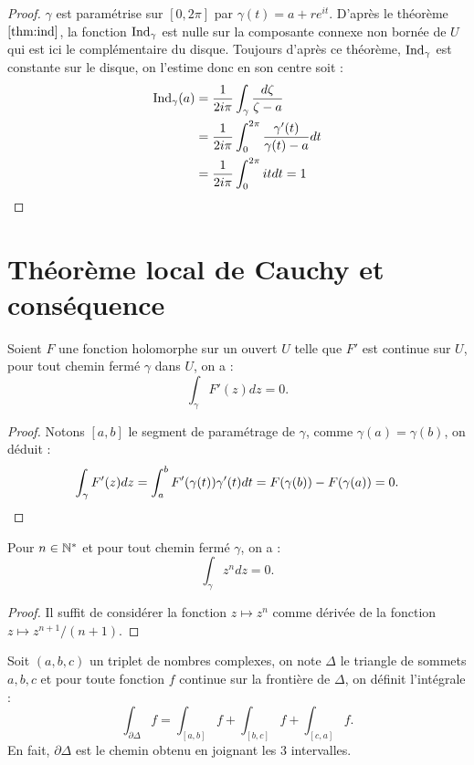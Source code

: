 \begin{proof}
$\gamma$ est paramétrise sur $[0, 2\pi]$ par $\gamma(t) = a + re^{it}$. 
D'après le théorème $\ref{thm:ind}$, la fonction $\operatorname{Ind}_{\gamma}$ est nulle sur la composante connexe non bornée de $U$
qui est ici le complémentaire du disque. 
Toujours d'après ce théorème, $\operatorname{Ind}_{\gamma}$ est constante sur le disque, on l'estime donc en son centre soit :
\begin{align*}
\operatorname{Ind}_{\gamma}(a) & = \dfrac1{2i\pi} \int_{\gamma} \dfrac{d\zeta}{\zeta-a} \\
& = \dfrac1{2i\pi} \int_0^{2\pi} \dfrac{\gamma'(t)}{\gamma(t)-a} dt \\
& = \dfrac1{2i\pi} \int_0^{2\pi} it dt = 1
\end{align*}
\end{proof}

\section{Théorème local de Cauchy et conséquence}

\begin{thm}
\label{thm:deriv}
Soient $F$ une fonction holomorphe sur un ouvert $U$ telle que $F'$ est continue sur $U$, 
pour tout chemin fermé $\gamma$ dans $U$, on a :
\[ \int_{\gamma} F'(z) dz = 0 . \]
\end{thm}

\begin{proof}
Notons $[a,b]$ le segment de paramétrage de $\gamma$, comme $\gamma(a) = \gamma(b)$, on déduit :
\[ \int_{\gamma} F'(z) dz = \int_{a}^{b} F'(\gamma(t)) \gamma'(t) dt = F(\gamma(b)) - F(\gamma(a)) = 0 . \]
\end{proof}

\begin{coro}
\label{coro:1}
Pour $n \in \mathbb{N}^\ast$ et pour tout chemin fermé $\gamma$, on a :
\[ \int_{\gamma} z^n dz = 0 . \]
\end{coro}

\begin{proof}
Il suffit de considérer la fonction $z \mapsto z^n$ comme dérivée de la fonction $z \mapsto z^{n+1}/(n+1)$.
\end{proof}

\begin{nota}
Soit $(a,b,c)$ un triplet de nombres complexes, on note $\Delta$ le triangle de sommets $a,b,c$ et pour toute fonction $f$
continue sur la frontière de $\Delta$, on définit l'intégrale :
\[ \int_{\partial \Delta} f = \int_{[a,b]} f + \int_{[b,c]} f + \int_{[c,a]} f . \]
En fait, $\partial \Delta$ est le chemin obtenu en joignant les 3 intervalles.
\end{nota}

